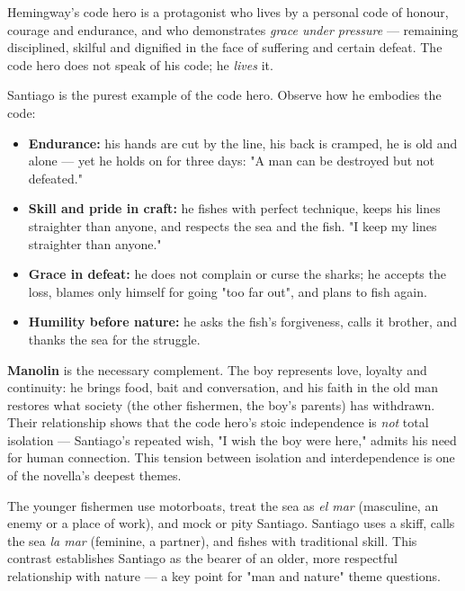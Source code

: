 \documentclass[11pt]{article}
\newcommand{\cle}[1]{{\popxbold\color{popdark}#1}}
\newcounter{popsec}
\newcounter{popsub}
\newcommand{\courssub}[1]{%
  \stepcounter{popsub}%
  \par\vspace{9pt}\noindent{\popxbold\fontsize{11.5}{13}\selectfont\color{popink}{\color{poporange}\thepopsec.\thepopsub}\hspace{6pt}#1}\par\nopagebreak\vspace{4pt}
}
\begin{document}
\courssub{Character Study: Santiago, the Code Hero}

\begin{definition}
Hemingway's \cle{code hero} is a protagonist who lives by a personal code of honour, courage and endurance, and who demonstrates \emph{grace under pressure} — remaining disciplined, skilful and dignified in the face of suffering and certain defeat. The code hero does not speak of his code; he \emph{lives} it.
\end{definition}

Santiago is the purest example of the code hero. Observe how he embodies the code:

\begin{itemize}
\item \textbf{Endurance:} his hands are cut by the line, his back is cramped, he is old and alone — yet he holds on for three days: "A man can be destroyed but not defeated."
\item \textbf{Skill and pride in craft:} he fishes with perfect technique, keeps his lines straighter than anyone, and respects the sea and the fish. "I keep my lines straighter than anyone."
\item \textbf{Grace in defeat:} he does not complain or curse the sharks; he accepts the loss, blames only himself for going "too far out", and plans to fish again.
\item \textbf{Humility before nature:} he asks the fish's forgiveness, calls it brother, and thanks the sea for the struggle.
\end{itemize}

\textbf{Manolin} is the necessary complement. The boy represents love, loyalty and continuity: he brings food, bait and conversation, and his faith in the old man restores what society (the other fishermen, the boy's parents) has withdrawn. Their relationship shows that the code hero's stoic independence is \emph{not} total isolation — Santiago's repeated wish, "I wish the boy were here," admits his need for human connection. This tension between \cle{isolation} and \cle{interdependence} is one of the novella's deepest themes.

\begin{aretenir}
The younger fishermen use motorboats, treat the sea as \emph{el mar} (masculine, an enemy or a place of work), and mock or pity Santiago. Santiago uses a skiff, calls the sea \emph{la mar} (feminine, a partner), and fishes with traditional skill. This contrast establishes Santiago as the bearer of an older, more respectful relationship with nature — a key point for "man and nature" theme questions.
\end{aretenir}
\end{document}
